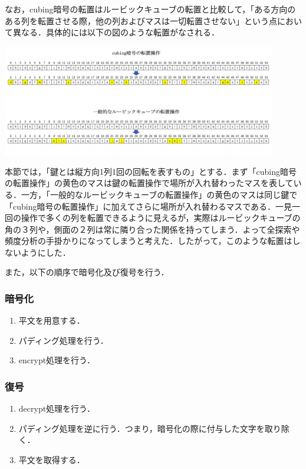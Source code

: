 \documentclass[titlepage]{jarticle}
\begin{document}
なお，cubing暗号の転置はルービックキューブの転置と比較して，「ある方向のある列を転置させる際，他の列およびマスは一切転置させない」という点において異なる．具体的には以下の図のような転置がなされる．\\
\begin{center}
  \includegraphics[width=12cm]{./tex_pic/trans.png}\\
\end{center}
本節では，「鍵とは縦方向1列1回の回転を表すもの」とする．まず「cubing暗号の転置操作」の黄色のマスは鍵の転置操作で場所が入れ替わったマスを表している．一方，「一般的なルービックキューブの転置操作」の黄色のマスは同じ鍵で「cubing暗号の転置操作」に加えてさらに場所が入れ替わるマスである．一見一回の操作で多くの列を転置できるように見えるが，実際はルービックキューブの角の３列や，側面の２列は常に隣り合った関係を持ってしまう．よって全探索や頻度分析の手掛かりになってしまうと考えた．したがって，このような転置はしないようにした．

また，以下の順序で暗号化及び復号を行う．
\subsubsection{暗号化}
\begin{enumerate}
\item 平文を用意する．
\item パディング処理を行う．
\item encrypt処理を行う．
\end{enumerate}

\subsubsection{復号}
\begin{enumerate}
\item decrypt処理を行う．
\item パディング処理を逆に行う．つまり，暗号化の際に付与した文字を取り除く．
\item 平文を取得する．
\end{enumerate}
\end{document}
